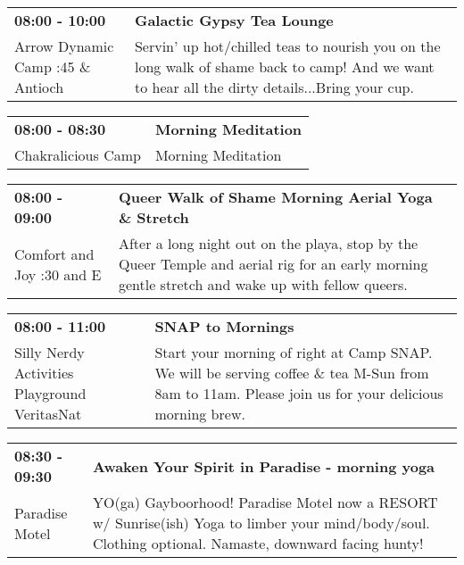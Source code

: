 \begin{tabular}{ p{1in} p{2.2in} }
    \textbf{08:00 - 10:00} & \textbf{Galactic Gypsy Tea Lounge} \\
    Arrow Dynamic Camp \newline 9:45 \& Antioch & Servin' up hot/chilled teas to nourish you on the long walk of shame back to camp! And we want to hear all the dirty details...Bring your cup. \\
    \hline 
\end{tabular}
    
\begin{tabular}{ p{1in} p{2.2in} }
    \textbf{08:00 - 08:30} & \textbf{Morning Meditation} \\
    Chakralicious Camp \newline  & Morning Meditation \\
    \hline 
\end{tabular}
    
\begin{tabular}{ p{1in} p{2.2in} }
    \textbf{08:00 - 09:00} & \textbf{Queer Walk of Shame Morning Aerial Yoga \& Stretch} \\
    Comfort and Joy \newline 7:30 and E & After a long night out on the playa, stop by the Queer Temple and aerial rig for an early morning gentle stretch and wake up with fellow queers. \\
    \hline 
\end{tabular}
    
\begin{tabular}{ p{1in} p{2.2in} }
    \textbf{08:00 - 11:00} & \textbf{SNAP to Mornings} \\
    Silly Nerdy Activities Playground \newline VeritasNat & Start your morning of right at Camp SNAP. We will be serving coffee \& tea M-Sun from 8am to 11am. Please join us for your delicious morning brew. \\
    \hline 
\end{tabular}
    
\begin{tabular}{ p{1in} p{2.2in} }
    \textbf{08:30 - 09:30} & \textbf{Awaken Your Spirit in Paradise - morning yoga} \\
    Paradise Motel \newline  & YO(ga) Gayboorhood! Paradise Motel now a RESORT w/ Sunrise(ish) Yoga to limber your mind/body/soul. Clothing optional. Namaste, downward facing hunty! \\
    \hline 
\end{tabular}
    
